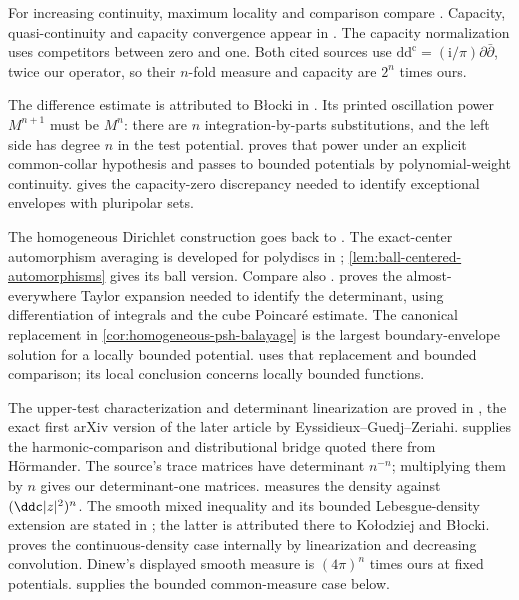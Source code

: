 For increasing continuity, maximum locality and comparison compare \cite[Theorem 3.23, pp.~89--91, and Theorems 3.27 and 3.29, pp.~93--94]{GZ17}. Capacity, quasi-continuity and capacity convergence appear in \cite[Proposition 4.19, Theorem 4.20 and Lemma 4.21, pp.~110--112, and Theorem 4.26, pp.~114--115]{GZ17}. The capacity normalization uses competitors between zero and one. Both cited sources use $\mathrm{dd}^{\mathrm c}=(\mathrm{i}/\pi)\partial\bar\partial$, twice our operator, so their $n$-fold measure and capacity are $2^n$ times ours.

The difference estimate is attributed to B\l{}ocki in \cite[Proposition 3.21, pp.~88--89]{GZ17}. Its printed oscillation power $M^{n+1}$ must be $M^n$: there are $n$ integration-by-parts substitutions, and the left side has degree $n$ in the test potential.  proves that power under an explicit common-collar hypothesis and passes to bounded potentials by polynomial-weight continuity.  gives the capacity-zero discrepancy needed to identify exceptional envelopes with pluripolar sets.


The homogeneous Dirichlet construction goes back to \cite{BT76}. The exact-center automorphism averaging is developed for polydiscs in \cite[Section 2.3, Theorem 2.3.2 and Proposition 2.3.3, pp.~50--52]{Blo02Pluripotential}; \cref{lem:ball-centered-automorphisms} gives its ball version. Compare also \cite[Theorems 5.13--5.14, pp.~143--149]{GZ17}.  proves the almost-everywhere Taylor expansion needed to identify the determinant, using differentiation of integrals and the cube Poincar\'e estimate. The canonical replacement in \cref{cor:homogeneous-psh-balayage} is the largest boundary-envelope solution for a locally bounded potential.  uses that replacement and bounded comparison; its local conclusion concerns locally bounded functions.

The upper-test characterization and determinant linearization are proved in \cite[Proposition 1.5 and Lemma 1.7, pp.~5--7]{EGZ10ViscosityV1}, the exact first arXiv version of the later article by Eyssidieux--Guedj--Zeriahi.  supplies the harmonic-comparison and distributional bridge quoted there from H\"ormander. The source's trace matrices have determinant $n^{-n}$; multiplying them by $n$ gives our determinant-one matrices.  measures the density against $(\ddc|z|^2)^n$. The smooth mixed inequality and its bounded Lebesgue-density extension are stated in \cite[Theorems 1.1--1.2, pp.~1--2]{Din07MixedV1}; the latter is attributed there to Ko\l{}odziej and B\l{}ocki.  proves the continuous-density case internally by linearization and decreasing convolution. Dinew's displayed smooth measure is $(4\pi)^n$ times ours at fixed potentials.  supplies the bounded common-measure case below.

